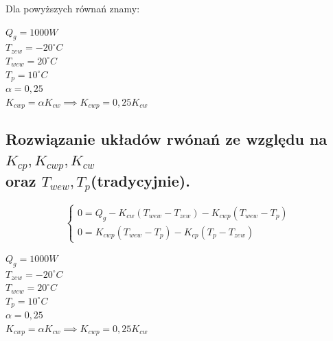 \documentclass{article}
\begin{document}
Dla powyższych równań znamy:
\begin{flushleft}
    $Q_{g}=1000W$ \\
    $T_{zew}=-20^{\circ}C$\\
    $T_{wew}=20^{\circ}C$\\
    $T_{p}=10^{\circ}C$\\
    $\alpha=0,25$\\
    $K_{cwp}=\alpha K_{cw} \implies K_{cwp}=0,25K_{cw}$\\
\end{flushleft}


\newpage
\begin{flushleft}
\section{Rozwiązanie układów rwónań ze względu na $K_{cp}, K_{cwp}, K_{cw}$ \\oraz $T_{wew}, T_{p}$(tradycyjnie).}

\end{flushleft}
$$
 \begin{cases}
        0=Q_{g} -K_{cw} (T_{wew} - T_{zew})-K_{cwp} (T_{wew} -T_{p})\\
        0=K_{cwp}(T_{wew}-T_{p})-K_{cp}(T_{p}-T_{zew})
\end{cases}
$$

\begin{center}
     $Q_{g}=1000W$ \\
    $T_{zew}=-20^{\circ}C$\\
    $T_{wew}=20^{\circ}C$\\
    $T_{p}=10^{\circ}C$\\
    $\alpha=0,25$\\
    $K_{cwp}=\alpha K_{cw} \implies K_{cwp}=0,25K_{cw}$\\
\end{center}
\end{document}
